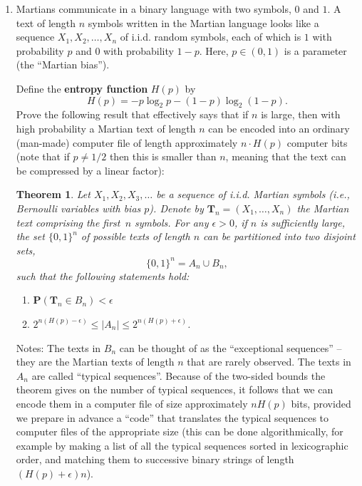 \documentclass[12pt]{article}
\newtheorem*{unnumberedthm}{Theorem}
\newcommand{\prob}{\mathbf{P}}
\newcommand{\expec}{\mathbf{E}}
\newcommand{\var}{\mathbf{V}}
\theoremstyle{example}
\begin{document}
\begin{enumerate}
Let $L_n$ denote the number of \textbf{spaghetti loops} at the end of this process (a loop is a chain of one or more spaghettis whose ends are tied to each other to form a cycle). Compute $\expec(L_n)$ and $\var(L_n)$. Find a sequence of numbers $(b_n)_{n=1}^\infty$ such that $$ \frac{L_n}{b_n} \xrightarrow[n\to\infty]{\prob} 1, $$
if such a sequence exists.

\item Martians communicate in a binary language with two symbols, $0$ and $1$. A text of length $n$ symbols written in the Martian language looks like a sequence $X_1, X_2, \ldots, X_n$ of i.i.d. random symbols, each of which is $1$ with probability $p$ and $0$ with probability $1-p$. Here, $p\in(0,1)$ is a parameter (the ``Martian bias'').

Define the \textbf{entropy function} $H(p)$ by
$$ H(p) = -p\log_2 p -(1-p)\log_2 (1-p). $$
Prove the following result that effectively says that if $n$ is large, then with high probability a Martian text of length $n$ can be encoded into an ordinary (man-made) computer file of length approximately $n\cdot H(p)$ computer bits (note that if $p\neq 1/2$ then this is smaller than $n$, meaning that the text can be compressed by a linear factor):

\begin{unnumberedthm} Let $X_1, X_2, X_3, \ldots $ be a sequence of i.i.d. Martian symbols (i.e., Bernoulli variables with bias $p$). Denote by $\textbf{T}_n=(X_1,\ldots,X_n)$ the Martian text comprising the first~$n$ symbols.
For any $\epsilon>0$, if $n$ is sufficiently large, the set $\{0,1\}^n$ of possible texts of length $n$ can be partitioned into two disjoint sets,
$$ \{0,1\}^n = A_n \cup B_n, $$
such that the following statements hold:
\begin{enumerate}
\item $\prob(\textbf{T}_n \in B_n) < \epsilon$
\item $2^{n(H(p)-\epsilon)} \le |A_n| \le 2^{n(H(p)+\epsilon)}$.
\end{enumerate}
\end{unnumberedthm}

\medskip \noindent
Notes: The texts in $B_n$ can be thought of as the ``exceptional sequences'' -- they are the Martian texts of length $n$ that are rarely observed. The texts in $A_n$ are called ``typical sequences''. Because of the two-sided bounds the theorem gives on the number of typical sequences, it follows that we can encode them in a computer file of size approximately $n H(p)$ bits, provided we prepare in advance a ``code'' that translates the typical sequences to computer files of the appropriate size (this can be done algorithmically, for example by making a list of all the typical sequences sorted in lexicographic order, and matching them to successive binary strings of length $(H(p)+\epsilon)n$).


\end{enumerate}
\end{document}
